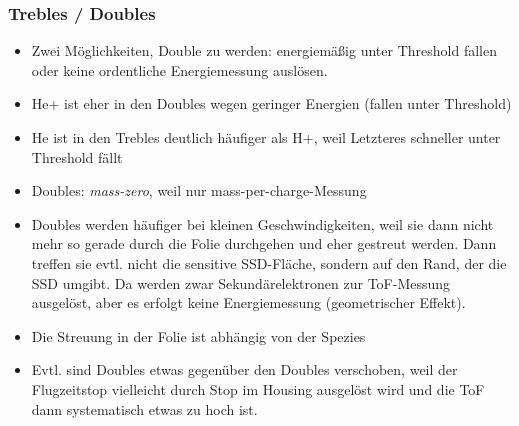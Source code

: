 \documentclass[]{article}
\begin{document}
\subsubsection{Trebles / Doubles}
\begin{itemize}
	\item Zwei Möglichkeiten, Double zu werden: energiemäßig unter Threshold fallen oder keine ordentliche Energiemessung auslösen.
	\item He+ ist eher in den Doubles wegen geringer Energien (fallen unter Threshold)
	\item He ist in den Trebles deutlich häufiger als H+, weil Letzteres schneller unter Threshold fällt
	\item Doubles: \textit{mass-zero}, weil nur mass-per-charge-Messung
	\item Doubles werden häufiger bei kleinen Geschwindigkeiten, weil sie dann nicht mehr so gerade durch die Folie durchgehen und eher gestreut werden. Dann treffen sie evtl. nicht die sensitive SSD-Fläche, sondern auf den Rand, der die SSD umgibt. Da werden zwar Sekundärelektronen zur ToF-Messung ausgelöst, aber es erfolgt keine Energiemessung (geometrischer Effekt).
	\item Die Streuung in der Folie ist abhängig von der Spezies
	\item Evtl. sind Doubles etwas gegenüber den Doubles verschoben, weil der Flugzeitstop vielleicht durch Stop im Housing ausgelöst wird und die ToF dann systematisch etwas zu hoch ist.
\end{itemize}
%
%
%
\end{document}
